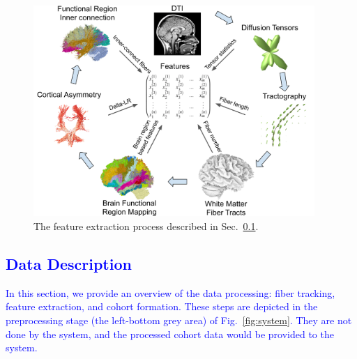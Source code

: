 \begin{figure}[t]
\centering
\includegraphics[width=0.95\textwidth]{images/Brainfeatures.png}
\caption{The feature extraction process described in Sec.~\ref{sec:extraction}.
}
\label{fig:Extraction}
\end{figure}


\subsection{\textcolor{blue}{Data Description}}
\label{sec:extraction}

\textcolor{blue}{In this section, we provide an overview of the data processing: fiber tracking, feature extraction, and cohort formation. These steps are depicted in the preprocessing stage (the left-bottom grey area) of Fig.~\ref{fig:system}. They are not done by the system, and the processed cohort data would be provided to the system. } 

